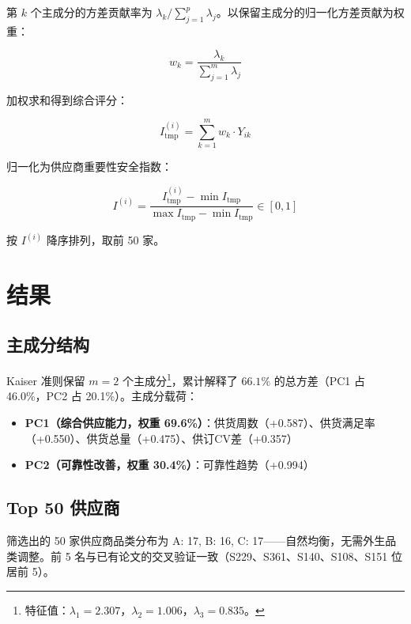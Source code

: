 \documentclass{internal-report}
\begin{document}
第 $k$ 个主成分的方差贡献率为 $\lambda_k / \sum_{j=1}^{p} \lambda_j$。以保留主成分的归一化方差贡献为权重：

\begin{equation}
    w_k = \frac{\lambda_k}{\sum_{j=1}^{m} \lambda_j}
\end{equation}

加权求和得到综合评分：

\begin{equation}
    I_{\text{tmp}}^{(i)} = \sum_{k=1}^{m} w_k \cdot Y_{ik}
\end{equation}

归一化为供应商重要性安全指数：

\begin{equation}
    \boxed{I^{(i)} = \frac{I_{\text{tmp}}^{(i)} - \min I_{\text{tmp}}}
                          {\max I_{\text{tmp}} - \min I_{\text{tmp}}} \in [0, 1]}
\end{equation}

按 $I^{(i)}$ 降序排列，取前 50 家。

\section{结果}

\subsection{主成分结构}

Kaiser 准则保留 $m = 2$ 个主成分\footnote{特征值：$\lambda_1 = 2.307$，$\lambda_2 = 1.006$，$\lambda_3 = 0.835$。}，累计解释了 $66.1\%$ 的总方差（PC1 占 46.0\%，PC2 占 20.1\%）。主成分载荷：

\begin{itemize}
    \item \textbf{PC1（综合供应能力，权重 69.6\%）}：供货周数（+0.587）、供货满足率（+0.550）、供货总量（+0.475）、供订CV差（+0.357）
    \item \textbf{PC2（可靠性改善，权重 30.4\%）}：可靠性趋势（+0.994）
\end{itemize}

\subsection{Top 50 供应商}

筛选出的 50 家供应商品类分布为 A: 17, B: 16, C: 17——自然均衡，无需外生品类调整。前 5 名与已有论文的交叉验证一致（S229、S361、S140、S108、S151 位居前 5）。
\end{document}
